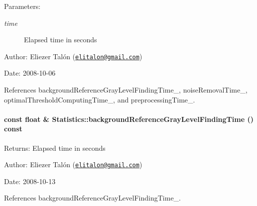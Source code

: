\begin{Desc}
\item[Parameters:]
\begin{description}
\item[{\em time}]Elapsed time in seconds\end{description}
\end{Desc}
\begin{Desc}
\item[Author:]Eliezer Talón (\href{mailto:elitalon@gmail.com}{\tt elitalon@gmail.com}) \end{Desc}
\begin{Desc}
\item[Date:]2008-10-06 \end{Desc}


References backgroundReferenceGrayLevelFindingTime\_\-, noiseRemovalTime\_\-, optimalThresholdComputingTime\_\-, and preprocessingTime\_\-.\hypertarget{class_statistics_d65adc1b3bd1d560408c5f9e06fde3d4}{
\paragraph[{backgroundReferenceGrayLevelFindingTime}]{\setlength{\rightskip}{0pt plus 5cm}const float \& Statistics::backgroundReferenceGrayLevelFindingTime () const}\hfill}
\label{class_statistics_d65adc1b3bd1d560408c5f9e06fde3d4}


\begin{Desc}
\item[Returns:]Elapsed time in seconds\end{Desc}
\begin{Desc}
\item[Author:]Eliezer Talón (\href{mailto:elitalon@gmail.com}{\tt elitalon@gmail.com}) \end{Desc}
\begin{Desc}
\item[Date:]2008-10-13 \end{Desc}


References backgroundReferenceGrayLevelFindingTime\_\-.

